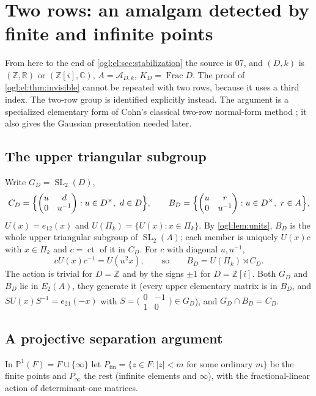 \documentclass[11pt,oneside]{article}
\numberwithin{equation}{section}
\theoremstyle{definition}
\theoremstyle{remark}
\newcommand{\Z}{\mathbb Z}
\newcommand{\R}{\mathbb R}
\newcommand{\C}{\mathbb C}
\newcommand{\PP}{\mathbb P}
\newcommand{\A}{\mathcal A}
\newcommand{\ct}{\operatorname{ct}}
\newcommand{\SL}{\operatorname{SL}}
\newcommand{\Frac}{\operatorname{Frac}}
\begin{document}
\section{Two rows: an amalgam detected by finite and infinite points}\label{ogl:el:sec:amalgam}

From here to the end of \cref{ogl:el:sec:stabilization} the source is 07, and $(D,k)$ is $(\Z,\R)$ or
$(\Z[i],\C)$, $A=\A_{D,k}$, $K_D=\Frac D$. The proof of
\cref{ogl:el:thm:invisible} cannot be repeated with two rows, because it uses a
third index. The two-row group is identified explicitly instead. The argument
is a specialized elementary form of Cohn's classical two-row normal-form method
\cite{Cohn}; it also gives the Gaussian presentation needed later.

\subsection{The upper triangular subgroup}
Write $G_D=\SL_2(D)$,
\[
 C_D=\Bigl\{\begin{pmatrix}u&d\\0&u^{-1}\end{pmatrix}:u\in D^\times,\ d\in D\Bigr\},
 \qquad
 B_D=\Bigl\{\begin{pmatrix}u&r\\0&u^{-1}\end{pmatrix}:u\in D^\times,\ r\in A\Bigr\},
\]
$U(x)=e_{12}(x)$ and $U(\Pi_k)=\{U(x):x\in\Pi_k\}$. By \cref{ogl:lem:units},
$B_D$ is the whole upper triangular subgroup of $\SL_2(A)$; each member is
uniquely $U(x)c$ with $x\in\Pi_k$ and $c=\ct$ of it in $C_D$. For $c$ with
diagonal $u,u^{-1}$,
\begin{equation}\label{ogl:el:eq:Caction}
 cU(x)c^{-1}=U(u^2x),\qquad\text{so}\qquad B_D=U(\Pi_k)\rtimes C_D .
\end{equation}
The action is trivial for $D=\Z$ and by the signs $\pm1$ for $D=\Z[i]$. Both
$G_D$ and $B_D$ lie in $E_2(A)$, they generate it (every upper elementary matrix
is in $B_D$, and $SU(x)S^{-1}=e_{21}(-x)$ with
$S=\bigl(\begin{smallmatrix}0&-1\\1&0\end{smallmatrix}\bigr)\in G_D$), and
$G_D\cap B_D=C_D$.

\subsection{A projective separation argument}
In $\PP^1(F)=F\cup\{\infty\}$ let $P_{\mathrm{fin}}=\{z\in F:|z|<m\text{ for
some ordinary }m\}$ be the finite points and $P_\infty$ the rest (infinite
elements and $\infty$), with the fractional-linear action of determinant-one
matrices.
\end{document}
